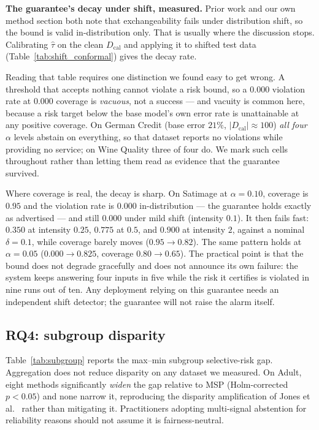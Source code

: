 \documentclass[conference]{IEEEtran}
\begin{document}


\textbf{The guarantee's decay under shift, measured.} Prior work and our
own method section both note that exchangeability fails under
distribution shift, so the bound is valid in-distribution only. That is
usually where the discussion stops. Calibrating $\hat\tau$ on the clean
$D_{\mathrm{cal}}$ and applying it to shifted test data
(Table~\ref{tab:shift_conformal}) gives the decay rate.

Reading that table requires one distinction we found easy to get wrong.
A threshold that accepts nothing cannot violate a risk bound, so a
$0.000$ violation rate at $0.000$ coverage is \emph{vacuous}, not a
success --- and vacuity is common here, because a risk target below the
base model's own error rate is unattainable at any positive coverage. On
German Credit (base error $21\%$, $|D_{\mathrm{cal}}| \approx 100$)
\emph{all four} $\alpha$ levels abstain on everything, so that dataset
reports no violations while providing no service; on Wine Quality three
of four do. We mark such cells throughout rather than letting them read
as evidence that the guarantee survived.

Where coverage is real, the decay is sharp. On Satimage at
$\alpha = 0.10$, coverage is $0.95$ and the violation rate is $0.000$
in-distribution --- the guarantee holds exactly as advertised --- and
still $0.000$ under mild shift (intensity $0.1$). It then fails fast:
$0.350$ at intensity $0.25$, $0.775$ at $0.5$, and $0.900$ at intensity
$2$, against a nominal $\delta = 0.1$, while coverage barely moves
($0.95 \to 0.82$). The same pattern holds at $\alpha = 0.05$
($0.000 \to 0.825$, coverage $0.80 \to 0.65$). The practical point is
that the bound does not degrade gracefully and does not announce its own
failure: the system keeps answering four inputs in five while the risk it
certifies is violated in nine runs out of ten. Any deployment relying on
this guarantee needs an independent shift detector; the guarantee will
not raise the alarm itself.



\subsection{RQ4: subgroup disparity}

Table~\ref{tab:subgroup} reports the max--min subgroup selective-risk gap.
Aggregation does not reduce disparity on any dataset we measured. On
Adult, eight methods significantly \emph{widen} the gap relative to MSP
(Holm-corrected $p<0.05$) and none narrow it, reproducing the disparity
amplification of Jones et al.~\cite{jones2021disparities} rather than
mitigating it. Practitioners adopting multi-signal abstention for
reliability reasons should not assume it is fairness-neutral.
\end{document}
